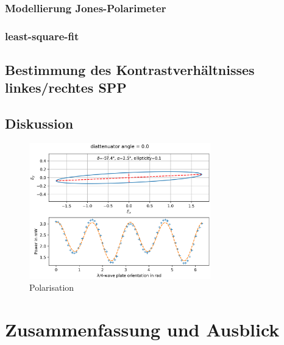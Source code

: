 \documentclass{article}
\begin{document}
		\subsubsection{Modellierung Jones-Polarimeter}
		\subsubsection{least-square-fit}
	\subsection{Bestimmung des Kontrastverhältnisses linkes/rechtes SPP}
	\subsection{Diskussion}
	\begin{figure}[htbp] 
		\centering
		\includegraphics[width=0.7\textwidth]{figures/polarimeter.png}
		\caption{Polarisation}
		\label{fig:polarimeter}
	\end{figure}
\section{Zusammenfassung und Ausblick}
\newpage

	
\end{document}
